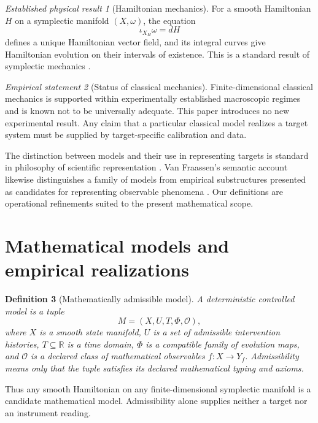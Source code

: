 \documentclass[11pt]{article}
\newtheorem{definition}{Definition}[section]
\theoremstyle{remark}
\newtheorem{empirical}[definition]{Empirical statement}
\newtheorem{established}[definition]{Established physical result}
\newcommand{\Real}{\mathbb{R}}
\begin{document}
\begin{established}[Hamiltonian mechanics]\label{est:ham}
For a smooth Hamiltonian $H$ on a symplectic manifold $(X,\omega)$, the equation
\[
 \iota_{X_H}\omega=dH
\]
defines a unique Hamiltonian vector field, and its integral curves give Hamiltonian evolution on their intervals of existence.  This is a standard result of symplectic mechanics \cite{AbrahamMarsden1978,MarsdenRatiu1999}.
\end{established}

\begin{empirical}[Status of classical mechanics]\label{emp:classical}
Finite-dimensional classical mechanics is supported within experimentally established macroscopic regimes and is known not to be universally adequate.  This paper introduces no new experimental result.  Any claim that a particular classical model realizes a target system must be supplied by target-specific calibration and data.
\end{empirical}

The distinction between models and their use in representing targets is standard in philosophy of scientific representation \cite{FriggNguyen2025}.  Van Fraassen's semantic account likewise distinguishes a family of models from empirical substructures presented as candidates for representing observable phenomena \cite{vanFraassen1980}.  Our definitions are operational refinements suited to the present mathematical scope.

\section{Mathematical models and empirical realizations}

\begin{definition}[Mathematically admissible model]\label{def:model}
A deterministic controlled model is a tuple
\[
 M=(X,U,T,\Phi,\mathcal O),
\]
where $X$ is a smooth state manifold, $U$ is a set of admissible intervention histories, $T\subseteq\Real$ is a time domain, $\Phi$ is a compatible family of evolution maps, and $\mathcal O$ is a declared class of mathematical observables $f:X\to Y_f$.  Admissibility means only that the tuple satisfies its declared mathematical typing and axioms.
\end{definition}
Thus any smooth Hamiltonian on any finite-dimensional symplectic manifold is a candidate mathematical model.  Admissibility alone supplies neither a target nor an instrument reading.
\end{document}
